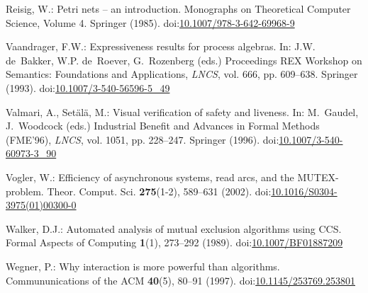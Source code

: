 \documentclass[smallcondensed]{svjour3}
\providecommand{\urlalt}[2]{\href{#1}{#2}}
\providecommand{\doi}[1]{doi:\urlalt{http://dx.doi.org/#1}{#1}}
\begin{document}
\begin{thebibliography}{10}
Reisig, W.: Petri nets -- an introduction.
 Monographs on Theoretical Computer Science, Volume 4.
  Springer (1985).
\newblock \doi{10.1007/978-3-642-69968-9}

Vaandrager, F.W.: Expressiveness results for process algebras.
\newblock In: J.W. de~Bakker, W.P. de~Roever, G.~Rozenberg (eds.) Proceedings
  REX Workshop on Semantics: Foundations and Applications, \emph{\rm LNCS},
  vol. 666, pp. 609--638. Springer (1993).
\newblock \doi{10.1007/3-540-56596-5\_49}

Valmari, A., Set\"{a}l\"{a}, M.: Visual verification of safety and liveness.
\newblock In: M.~Gaudel, J.~Woodcock (eds.) Industrial Benefit and Advances in
  Formal Methods (FME'96), \emph{\rm LNCS}, vol. 1051, pp. 228--247. Springer
  (1996).
\newblock \doi{10.1007/3-540-60973-3\_90}

Vogler, W.: Efficiency of asynchronous systems, read arcs, and the
  {MUTEX}-problem.
\newblock Theor. Comput. Sci. \textbf{275}(1-2), 589--631 (2002).
\newblock \doi{10.1016/S0304-3975(01)00300-0}

Walker, D.J.: Automated analysis of mutual exclusion algorithms using {CCS}.
\newblock Formal Aspects of Computing \textbf{1}(1), 273--292 (1989).
\newblock \doi{10.1007/BF01887209}

Wegner, P.: Why interaction is more powerful than algorithms.
\newblock Commununications of the ACM \textbf{40}(5), 80--91 (1997).
\newblock \doi{10.1145/253769.253801}

\end{thebibliography}
\end{document}
